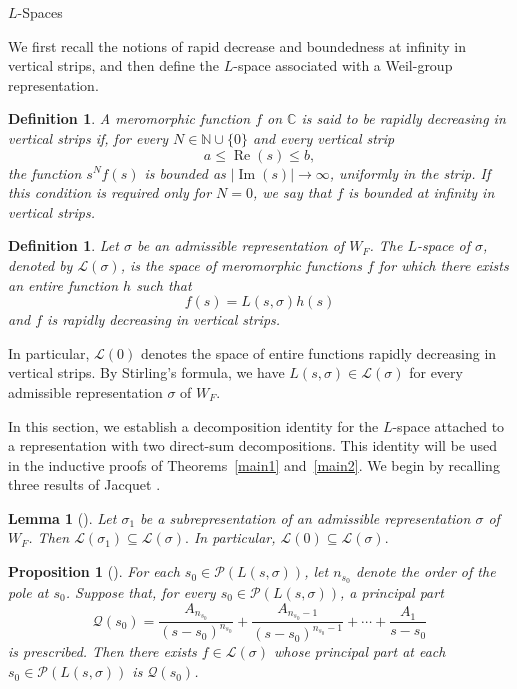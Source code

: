 \documentclass[12pt,reqno]{amsart}
\numberwithin{equation}{section}%
\numberwithin{equation}{subsection}
\newtheorem{prop}[equation]{Proposition}
\newtheorem{lemma}[equation]{Lemma}
\newtheorem{defn}[equation]{Definition}
\theoremstyle{definition}
\theoremstyle{remark}
\begin{document}
\begin{section}{\texorpdfstring{$L$}{L}-Spaces}\label{s3}

We first recall the notions of rapid decrease and boundedness at infinity in vertical strips, and then define the \(L\)-space associated with a Weil-group representation.

\begin{defn}
A meromorphic function $f$ on $\mathbb{C}$ is said to be
\emph{rapidly decreasing in vertical strips} if, for every
$N\in\mathbb{N}\cup\{0\}$ and every vertical strip
\[
a\leq\operatorname{Re}(s)\leq b,
\]
the function $s^Nf(s)$ is bounded as
$|\operatorname{Im}(s)|\to\infty$, uniformly in the strip. If this
condition is required only for $N=0$, we say that $f$ is
\emph{bounded at infinity in vertical strips}.
\end{defn}

\begin{defn}
Let $\sigma$ be an admissible representation of $W_F$. The
\emph{$L$-space of $\sigma$}, denoted by $\mathcal{L}(\sigma)$, is the
space of meromorphic functions $f$ for which there exists an entire
function $h$ such that
\[
f(s)=L(s,\sigma)h(s)
\]
and $f$ is rapidly decreasing in vertical strips.
\end{defn}

In particular, $\mathcal{L}(0)$ denotes the space of entire functions rapidly decreasing in vertical strips. By Stirling's formula, we have $L(s,\sigma)\in\mathcal{L}(\sigma)$ for every admissible representation $\sigma$ of $W_F$.

In this section, we establish a decomposition identity for the
\(L\)-space attached to a representation with two direct-sum
decompositions. This identity will be used in the inductive proofs of
Theorems~\ref{main1} and~\ref{main2}. We begin by recalling three
results of Jacquet \cite{Jac2009}.

\begin{lemma}[{\cite[Lemma~12.1]{Jac2009}}]
\label{lem:Jac2009-12.1}
Let $\sigma_1$ be a subrepresentation of an admissible representation
$\sigma$ of $W_F$. Then $\mathcal{L}(\sigma_1)\subseteq\mathcal{L}(\sigma).$ 
In particular, $\mathcal{L}(0)\subseteq\mathcal{L}(\sigma).
$
\end{lemma}

\begin{prop}[{\cite[Proposition~12.1]{Jac2009}}]
\label{prop:Jac2009-12.1}
For each $s_0\in\mathcal{P}(L(s,\sigma))$, let $n_{s_0}$ denote the
order of the pole at $s_0$. Suppose that, for every
$s_0\in\mathcal{P}(L(s,\sigma))$, a principal part
\[
\mathcal{Q}(s_0)
=
\frac{A_{n_{s_0}}}{(s-s_0)^{n_{s_0}}}
+
\frac{A_{n_{s_0}-1}}{(s-s_0)^{n_{s_0}-1}}
+\cdots+
\frac{A_1}{s-s_0}
\]
is prescribed. Then there exists $f\in\mathcal{L}(\sigma)$ whose
principal part at each $s_0\in\mathcal{P}(L(s,\sigma))$ is
$\mathcal{Q}(s_0)$.
\end{prop}


\end{section}
\end{document}
